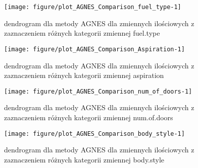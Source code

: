 \documentclass[12pt, a4paper]{article}\usepackage[]{graphicx}\usepackage[]{xcolor}
\makeatletter
\def\maxwidth{ %
  \ifdim\Gin@nat@width>\linewidth
    \linewidth
  \else
    \Gin@nat@width
  \fi
}
\newenvironment{knitrout}{}{} %
\makeatother
\begin{document}
\begin{knitrout}
\color{fgcolor}\begin{figure}[H]

{\centering \texttt{[image: figure/plot\_AGNES\_Comparison\_fuel\_type-1]} 

}

\caption[dendrogram dla metody AGNES dla zmiennych ilościowych z zaznaczeniem różnych kategorii zmiennej fuel.type]{dendrogram dla metody AGNES dla zmiennych ilościowych z zaznaczeniem różnych kategorii zmiennej fuel.type}\label{fig:plot_AGNES_Comparison_fuel.type}
\end{figure}

\end{knitrout}
\begin{knitrout}
\color{fgcolor}\begin{figure}[H]

{\centering \texttt{[image: figure/plot\_AGNES\_Comparison\_Aspiration-1]} 

}

\caption[dendrogram dla metody AGNES dla zmiennych ilościowych z zaznaczeniem różnych kategorii zmiennej aspiration]{dendrogram dla metody AGNES dla zmiennych ilościowych z zaznaczeniem różnych kategorii zmiennej aspiration}\label{fig:plot_AGNES_Comparison_Aspiration}
\end{figure}

\end{knitrout}

\begin{knitrout}
\color{fgcolor}\begin{figure}[H]

{\centering \texttt{[image: figure/plot\_AGNES\_Comparison\_num\_of\_doors-1]} 

}

\caption[dendrogram dla metody AGNES dla zmiennych ilościowych z zaznaczeniem różnych kategorii zmiennej num.of.doors]{dendrogram dla metody AGNES dla zmiennych ilościowych z zaznaczeniem różnych kategorii zmiennej num.of.doors}\label{fig:plot_AGNES_Comparison_num.of.doors}
\end{figure}

\end{knitrout}
\begin{knitrout}
\color{fgcolor}\begin{figure}[H]

{\centering \texttt{[image: figure/plot\_AGNES\_Comparison\_body\_style-1]} 

}

\caption[dendrogram dla metody AGNES dla zmiennych ilościowych z zaznaczeniem różnych kategorii zmiennej body.style]{dendrogram dla metody AGNES dla zmiennych ilościowych z zaznaczeniem różnych kategorii zmiennej body.style}\label{fig:plot_AGNES_Comparison_body.style}
\end{figure}

\end{knitrout}
\end{document}
